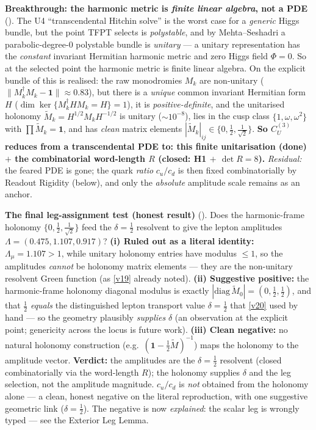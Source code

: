 \documentclass[11pt,a4paper]{article}
\begin{document}
\par\smallskip\noindent\textbf{Breakthrough: the harmonic metric is \emph{finite linear algebra}, not a PDE} (\mE).
The U4 ``transcendental Hitchin solve'' is the worst case for a \emph{generic} Higgs bundle, but the point
TFPT selects is \emph{polystable}, and by Mehta--Seshadri a parabolic-degree-$0$ polystable bundle is
\emph{unitary} --- a unitary representation has the \emph{constant} invariant Hermitian harmonic metric and
zero Higgs field $\Phi=0$. So at the selected point the harmonic metric is finite linear algebra. On the
explicit bundle of  this is realised: the raw monodromies $M_k$ are
non-unitary ($\|M_k^\dagger M_k-\mathbf1\|\!\approx\!0.83$), but there is a \emph{unique} common invariant
Hermitian form $H$ ($\dim\ker\{M_k^\dagger HM_k=H\}=1$), it is \emph{positive-definite}, and the unitarised
holonomy $\widetilde M_k=H^{1/2}M_kH^{-1/2}$ is unitary ($\sim10^{-8}$), lies in the cusp class
$\{1,\omega,\omega^2\}$ with $\prod\widetilde M_k=\mathbf1$, and has \emph{clean} matrix elements
$|\widetilde M_k|_{ij}\in\{0,\tfrac12,\tfrac1{\sqrt2}\}$. \textbf{So $C_U^{(3)}$ reduces from a transcendental
PDE to: this finite unitarisation (done) $+$ the combinatorial word-length $R$ (closed: H1 $+$ $\det R=8$).}
\emph{Residual:} the feared PDE is gone; the quark \emph{ratio} $c_u/c_d$ is then fixed combinatorially by
Readout Rigidity (below), and only the \emph{absolute} amplitude scale remains as an anchor.


\par\smallskip\noindent\textbf{The final leg-assignment test (honest result)} (\mE).
Does the harmonic-frame holonomy $\{0,\tfrac12,\tfrac1{\sqrt2}\}$ feed the $\delta=\tfrac12$ resolvent to
give the lepton amplitudes $\Lambda=(0.475,1.107,0.917)$? \textbf{(i) Ruled out as a literal identity:}
$\Lambda_\mu=1.107>1$, while unitary holonomy entries have modulus $\le1$, so the amplitudes \emph{cannot}
be holonomy matrix elements --- they are the non-unitary resolvent Green function (as \vref{v19} already noted).
\textbf{(ii) Suggestive positive:} the harmonic-frame holonomy diagonal modulus is exactly
$|\mathrm{diag}\,\widetilde M_0|=(0,\tfrac12,\tfrac12)$, and that $\tfrac12$ \emph{equals} the distinguished
lepton transport value $\delta=\tfrac12$ that \vref{v20} used by hand --- so the geometry plausibly \emph{supplies}
$\delta$ (an observation at the explicit point; genericity across the locus is future work).
\textbf{(iii) Clean negative:} no natural holonomy construction (e.g.\ $(\mathbf1-\tfrac12\widetilde M)^{-1}$)
maps the holonomy to the amplitude vector. \textbf{Verdict:} the amplitudes are the $\delta=\tfrac12$
resolvent (closed combinatorially via the word-length $R$); the holonomy supplies $\delta$ and the leg
selection, not the amplitude magnitude. $c_u/c_d$ is \emph{not} obtained from the holonomy alone --- a clean,
honest negative on the literal reproduction, with one suggestive geometric link ($\delta=\tfrac12$). The
negative is now \emph{explained}: the scalar leg is wrongly typed --- see the Exterior Leg Lemma.
\end{document}
